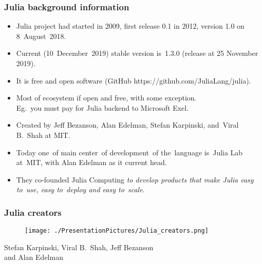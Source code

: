 \documentclass[10pt,t]{beamer}
\begin{document}
\begin{frame}
  \frametitle{Julia background information}


  \begin{itemize}
    \RaggedRight

  \item Julia project had started in 2009, first release 0.1 in 2012,
    version 1.0 on 8~August~2018.

  \item Current (10~December~2019) stable version is~1.3.0 (release at
    25 November 2019).

  \item It is \alert{free} and \alert{open software} (GitHub
    {https://github.com/JuliaLang/julia}).

  \item Most of ecosystem if open and free, with \alert{some}
    exception. \\
    Eg.~you must pay for Julia backend to Microsoft Exel.

  \item Created by Jeff Bezanson, Alan Edelman, Stefan Karpinski,
    and~Viral B.~Shah at MIT.

  \item Today one~of main center~of development~of the~language
    is~Julia Lab at~MIT, with Alan Edelman as it current head.

  \item They co-founded Julia Computing \textit{to develop products that
      make Julia easy to~use, easy to~deploy and easy to~scale}.

  \end{itemize}

\end{frame}





\begin{frame}
  \frametitle{Julia creators}


  \begin{figure}

    \centering

    \texttt{[image: ./PresentationPictures/Julia\_creators.png]}

  \end{figure}


  \begin{center}

    Stefan Karpinski, Viral B.~Shah, Jeff Bezanson \\
    \hspace{-12em} and Alan Edelman

  \end{center}

\end{frame}
\end{document}
